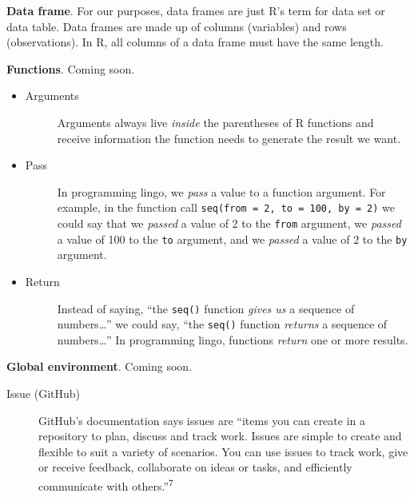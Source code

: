 \documentclass[
  letterpaper,
  DIV=11,
  numbers=noendperiod]{scrreprt}
\begin{document}
\textbf{Data frame}. For our purposes, data frames are just R's term for
data set or data table. Data frames are made up of columns (variables)
and rows (observations). In R, all columns of a data frame must have the
same length.

\textbf{Functions}. Coming soon.

\begin{itemize}
\item
  \begin{description}
  \item[\label{glossary-arguments}{Arguments}]
  Arguments always live \emph{inside} the parentheses of R functions and
  receive information the function needs to generate the result we want.
  \end{description}
\item
  \begin{description}
  \item[\label{glossary-pass}{Pass}]
  In programming lingo, we \emph{pass} a value to a function argument.
  For example, in the function call
  \texttt{seq(from\ =\ 2,\ to\ =\ 100,\ by\ =\ 2)} we could say that we
  \emph{passed} a value of 2 to the \texttt{from} argument, we
  \emph{passed} a value of 100 to the \texttt{to} argument, and we
  \emph{passed} a value of 2 to the \texttt{by} argument.
  \end{description}
\item
  \begin{description}
  \item[\label{glossary-return}{Return}]
  Instead of saying, ``the \texttt{seq()} function \emph{gives us} a
  sequence of numbers\ldots{}'' we could say, ``the \texttt{seq()}
  function \emph{returns} a sequence of numbers\ldots{}'' In programming
  lingo, functions \emph{return} one or more results.
  \end{description}
\end{itemize}

\textbf{Global environment}. Coming soon.

\begin{description}
\item[\label{glossary-issue}{Issue (GitHub)}]
GitHub's documentation says issues are ``items you can create in a
repository to plan, discuss and track work. Issues are simple to create
and flexible to suit a variety of scenarios. You can use issues to track
work, give or receive feedback, collaborate on ideas or tasks, and
efficiently communicate with others.''\textsuperscript{7}
\end{description}
\end{document}
